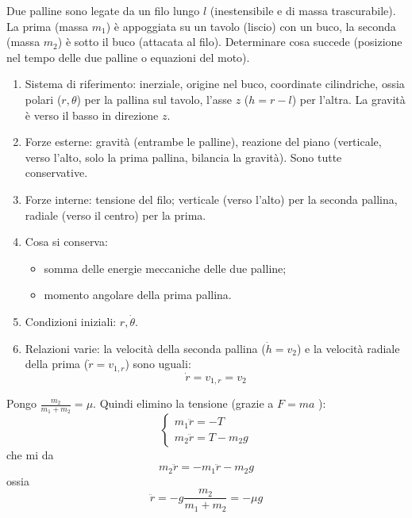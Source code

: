 \documentclass[../main.tex]{subfiles}
\begin{document}

\textex
Due palline sono legate da un filo lungo $l$ (inestensibile e di massa trascurabile). La prima (massa  $m_1$) \`e appoggiata su un tavolo (liscio) con un buco, la seconda (massa  $m_2$) \`e sotto il buco (attacata al filo). Determinare cosa succede (posizione nel tempo delle due palline o equazioni del moto).

\solution
\begin{enumerate}
  \item Sistema di riferimento: inerziale, origine nel buco, coordinate cilindriche, ossia polari ($r,\theta $) per la pallina sul tavolo, l'asse $z$ ($h=r-l$) per l'altra. La gravit\`a \`e verso il basso in direzione $z$.
  \item Forze esterne: gravit\`a (entrambe le palline), reazione del piano (verticale, verso l'alto, solo la prima pallina, bilancia la gravit\`a). Sono tutte conservative.
  \item Forze interne: tensione del filo; verticale (verso l'alto) per la seconda pallina, radiale (verso il centro) per la prima.
  \item Cosa si conserva:
  \begin{itemize}
    \item somma delle energie meccaniche delle due palline;
    \item momento angolare della prima pallina.
  \end{itemize}
  \item Condizioni iniziali: $r,\dot{\theta }$.
  \item Relazioni varie: la velocit\`a della seconda pallina ($\dot h=v_2$) e la velocit\`a radiale della prima ($\dot r=v_{1,r}$) sono uguali:
  \begin{equation}
    \label{bt:rdot}
    \dot r=v_{1,r}=v_2
  \end{equation}
\end{enumerate}

Pongo  $\frac{m_2}{m_1+m_2}=\mu $. Quindi elimino la tensione (grazie a  $F=ma$ ):
\begin{equation}
  \left\{ \begin{matrix}
    m_1\ddot r=-T \\
    m_2\ddot r=T-m_2g
  \end{matrix} \right .
\end{equation}
che mi da
\begin{equation}
  m_2\ddot r=-m_1\ddot r-m_2g
\end{equation}
ossia
\begin{equation}
  \ddot r=-g\frac{m_2}{m_1+m_2}=-\mu g
\end{equation}
\end{document}
